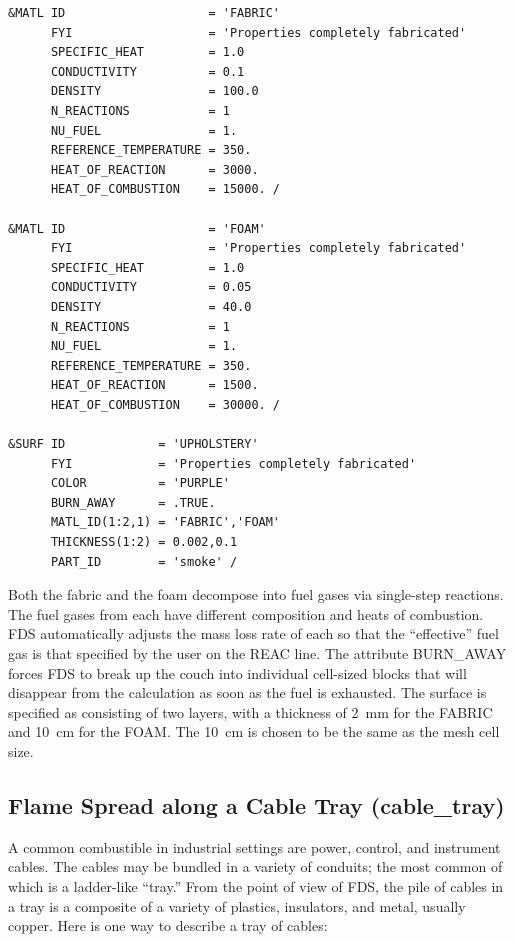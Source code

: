 \documentclass[11pt]{book}
\begin{document}
\footnotesize
\begin{verbatim}
&MATL ID                    = 'FABRIC'
      FYI                   = 'Properties completely fabricated'
      SPECIFIC_HEAT         = 1.0
      CONDUCTIVITY          = 0.1
      DENSITY               = 100.0
      N_REACTIONS           = 1
      NU_FUEL               = 1.
      REFERENCE_TEMPERATURE = 350.
      HEAT_OF_REACTION      = 3000.
      HEAT_OF_COMBUSTION    = 15000. /

&MATL ID                    = 'FOAM'
      FYI                   = 'Properties completely fabricated'
      SPECIFIC_HEAT         = 1.0
      CONDUCTIVITY          = 0.05
      DENSITY               = 40.0
      N_REACTIONS           = 1
      NU_FUEL               = 1.
      REFERENCE_TEMPERATURE = 350.
      HEAT_OF_REACTION      = 1500.
      HEAT_OF_COMBUSTION    = 30000. /

&SURF ID             = 'UPHOLSTERY'
      FYI            = 'Properties completely fabricated'
      COLOR          = 'PURPLE'
      BURN_AWAY      = .TRUE.
      MATL_ID(1:2,1) = 'FABRIC','FOAM'
      THICKNESS(1:2) = 0.002,0.1
      PART_ID        = 'smoke' /
\end{verbatim} \normalsize

\noindent
Both the fabric and the foam decompose into fuel gases via single-step reactions. The fuel gases from each have different
composition and heats of combustion. FDS automatically adjusts the mass loss rate of each so that the ``effective'' fuel gas
is that specified by the user on the {\ct REAC} line. The attribute {\ct BURN\_AWAY} forces FDS to break up the couch into
individual cell-sized blocks that will disappear from the calculation as soon as the fuel is exhausted. The surface is specified
as consisting of two layers, with a thickness of 2~mm for the {\ct FABRIC} and 10~cm for the {\ct FOAM}. The 10~cm is chosen to be the
same as the mesh cell size.





\clearpage
\subsection{Flame Spread along a Cable Tray ({\bf cable\_tray}) }

A common combustible in industrial settings are power, control, and instrument cables. The cables may be bundled in a variety of conduits; the most
common of which is a ladder-like ``tray.'' From the point of view of FDS, the pile of cables in a tray is a composite of a variety of plastics, insulators,
and metal, usually copper. Here is one way to describe a tray of cables:
\end{document}

